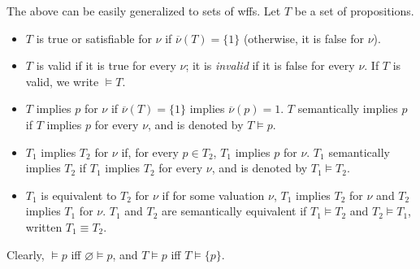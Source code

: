 \documentclass[12pt]{article}
\begin{document}
The above can be easily generalized to sets of wffs.  Let $T$ be a set of propositions.
\begin{itemize}
\item $T$ is true or satisfiable for $\nu$ if $\overline{\nu}(T)=\lbrace 1\rbrace$ (otherwise, it is false for $\nu$).
\item $T$ is valid if it is true for every $\nu$; it is \emph{invalid} if it is false for every $\nu$.  If $T$ is valid, we write $\models T$.
\item $T$ implies $p$ for $\nu$ if $\overline{\nu}(T)=\lbrace 1\rbrace$ implies $\overline{\nu}(p)=1$.  $T$ semantically implies $p$ if $T$ implies $p$ for every $\nu$, and is denoted by $T\models p$.  
\item $T_1$ implies $T_2$ for $\nu$ if, for every $p\in T_2$, $T_1$ implies $p$ for $\nu$.  $T_1$ semantically implies $T_2$ if $T_1$ implies $T_2$ for every $\nu$, and is denoted by $T_1 \models T_2$.
\item $T_1$ is equivalent to $T_2$ for $\nu$ if for some valuation $\nu$, $T_1$ implies $T_2$ for $\nu$ and $T_2$ implies $T_1$ for $\nu$.  $T_1$ and $T_2$ are semantically equivalent if $T_1 \models T_2$ and $T_2 \models T_1$, written $T_1 \equiv T_2$.
\end{itemize}

Clearly, $\models p$ iff $\varnothing \models p$, and $T\models p$ iff $T\models \lbrace p\rbrace$.

\end{document}
